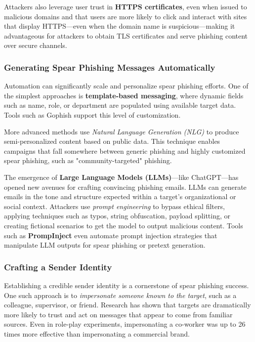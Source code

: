 Attackers also leverage user trust in \textbf{HTTPS certificates}, even when issued to malicious domains and that users are more likely to click and interact with sites that display HTTPS—even when the domain name is suspicious—making it advantageous for attackers to obtain TLS certificates and serve phishing content over secure channels.

\subsubsection{Generating Spear Phishing Messages Automatically}

Automation can significantly scale and personalize spear phishing efforts. One of the simplest approaches is \textbf{template-based messaging}, where dynamic fields such as name, role, or department are populated using available target data. Tools such as Gophish support this level of customization.

More advanced methods use \textit{Natural Language Generation (NLG)} to produce semi-personalized content based on public data. This technique enables campaigns that fall somewhere between generic phishing and highly customized spear phishing, such as "community-targeted" phishing.

The emergence of \textbf{Large Language Models (LLMs)}—like ChatGPT—has opened new avenues for crafting convincing phishing emails. LLMs can generate emails in the tone and structure expected within a target's organizational or social context. Attackers use \textit{prompt engineering} to bypass ethical filters, applying techniques such as typos, string obfuscation, payload splitting, or creating fictional scenarios to get the model to output malicious content. Tools such as \textbf{PrompInject} even automate prompt injection strategies that manipulate LLM outputs for spear phishing or pretext generation.

\subsubsection{Crafting a Sender Identity}
Establishing a credible sender identity is a cornerstone of spear phishing success. One such approach is to \textit{impersonate someone known to the target}, such as a colleague, supervisor, or friend. Research has shown that targets are dramatically more likely to trust and act on messages that appear to come from familiar sources. Even in role-play experiments, impersonating a co-worker was up to 26 times more effective than impersonating a commercial brand.

